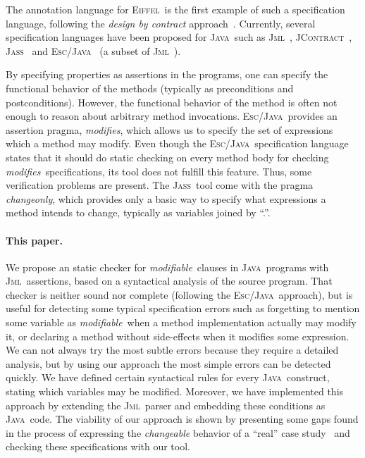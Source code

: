 \documentclass[a4paper]{llncs}
\newcommand{\jml}{\textsc{Jml}}
\newcommand{\escj}{\textsc{Esc/Java}}
\newcommand{\jass}{\textsc{Jass}}
\newcommand{\jcontract}{\textsc{JContract}}
\newcommand{\java}{\textsc{Java}}
\newcommand{\eiff}{\textsc{Eiffel}}
\newcommand{\modif}{\textit{modifiable}}
\newcommand{\modifies}{\textit{modifies}}
\begin{document}
The annotation language for \eiff~is the first example of such a
specification language, following the \emph{design by contract}
approach~\cite{Mey97}. Currently, several specification languages have
been proposed for \java~such as \jml~\cite{LBR00},
\jcontract~\cite{JContractUrl}, \jass~\cite{JassUrl} and
\escj~\cite{LeinoNS00} (a subset of \jml~\cite{EscJmlDiff}). 

By specifying properties as assertions in the programs, one can
specify the functional behavior of the methods (typically as
preconditions and postconditions). However, the functional behavior of
the method is
often not enough to reason about arbitrary method
invocations. \escj~provides an assertion pragma, \modifies, which
allows us to
specify the set of expressions which a method may
modify. Even though the \escj~specification language states that it
should
do static checking on every method body for checking
\modifies~specifications, its tool does not fulfill
this feature. Thus, some verification problems are
present. The \jass~tool come with the pragma \textit{changeonly},
which provides only a basic way to specify what expressions a method
intends to change, typically as variables joined by ``.''.






\paragraph{\bf This paper.}We propose an static checker for
\modif~clauses in \java~programs with \jml~assertions, based on a
syntactical analysis of the source program. That
checker is neither sound nor complete (following the \escj~approach),
but is useful
for detecting some typical specification errors such as
forgetting to mention some variable
as \modif~when a method implementation actually may modify it, or
declaring a method without side-effects when it modifies some
expression. We can not always try the most subtle errors because they 
require a detailed analysis, but by using our approach the most
simple errors can be detected quickly. We have defined certain
syntactical rules for every \java~construct, stating which
variables may be modified. Moreover, we have implemented
this approach by extending the \jml~parser and embedding these
conditions as \java~code. The viability of our approach is
shown by presenting some gaps found in the process of expressing the
\emph{changeable} behavior of a ``real'' case study~\cite{CH02} and
checking these specifications with our tool.
\end{document}
